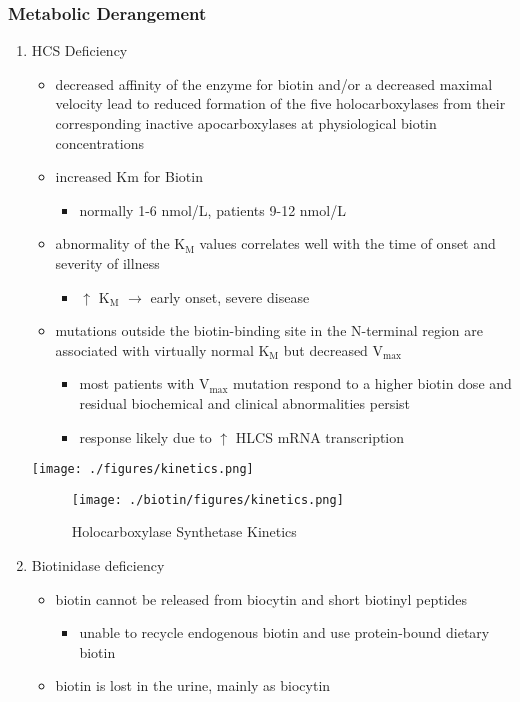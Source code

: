 \documentclass{scrartcl}
\begin{document}
\subsubsection{Metabolic Derangement}
\label{sec:org8c0da83}
\begin{enumerate}
\item HCS Deficiency
\label{sec:org54c90ef}
\begin{itemize}
\item decreased affinity of the enzyme for biotin and/or a decreased
maximal velocity lead to reduced formation of the five
holocarboxylases from their corresponding inactive apocarboxylases
at physiological biotin concentrations
\item increased Km for Biotin
\begin{itemize}
\item normally 1-6 nmol/L, patients 9-12 nmol/L
\end{itemize}
\item abnormality of the K\(_{\text{M}}\) values correlates well with the time of onset
and severity of illness
\begin{itemize}
\item \(\uparrow\) K\(_{\text{M}}\) \(\to\) early onset, severe disease
\end{itemize}

\item mutations outside the biotin-binding site in the N-terminal region
are associated with virtually normal K\(_{\text{M}}\) but decreased V\(_{\text{max}}\)
\begin{itemize}
\item most patients with V\(_{\text{max}}\) mutation respond to a higher biotin
dose and residual biochemical and clinical abnormalities persist
\item response likely due to \(\uparrow\) HLCS mRNA transcription
\end{itemize}
\end{itemize}

\begin{center}
\texttt{[image: ./figures/kinetics.png]}
\end{center}

\begin{figure}[htbp]
\centering
\texttt{[image: ./biotin/figures/kinetics.png]}
\caption[Kinetics]{\label{fig:org97d23f7}
Holocarboxylase Synthetase Kinetics}
\end{figure}

\item Biotinidase deficiency
\label{sec:org3d13531}
\begin{itemize}
\item biotin cannot be released from biocytin and short biotinyl
peptides
\begin{itemize}
\item unable to recycle endogenous biotin and use protein-bound dietary biotin
\end{itemize}
\item biotin is lost in the urine, mainly as biocytin
\end{itemize}
\end{enumerate}
\end{document}
